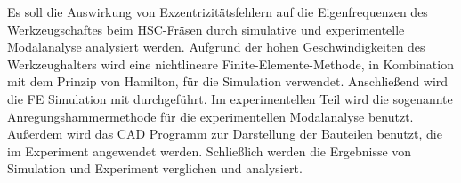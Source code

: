 	Es soll die Auswirkung von Exzentrizitätsfehlern auf die Eigenfrequenzen des Werkzeugschaftes beim HSC-Fräsen durch simulative und experimentelle Modalanalyse analysiert werden. Aufgrund der hohen Geschwindigkeiten des Werkzeughalters wird eine nichtlineare Finite-Elemente-Methode, in Kombination mit dem Prinzip von Hamilton, für die Simulation verwendet. Anschließend wird die FE Simulation mit \Matlab durchgeführt. Im experimentellen Teil wird die sogenannte Anregungshammermethode für die experimentellen Modalanalyse benutzt. Außerdem wird das CAD Programm \SolidWorks zur Darstellung der Bauteilen benutzt, die im Experiment angewendet werden. Schließlich werden die Ergebnisse von Simulation und Experiment verglichen und analysiert.
	